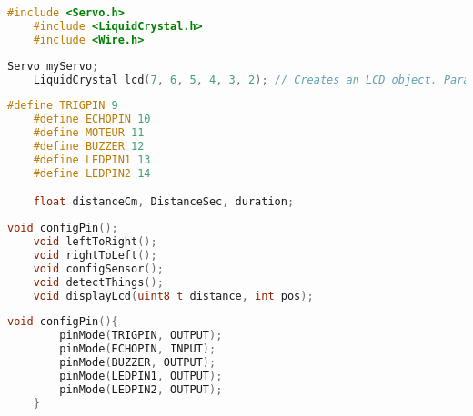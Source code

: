 
\begin{lstlisting}[language=cpp,caption={Insert Library}]
    #include <Servo.h>
    #include <LiquidCrystal.h>
    #include <Wire.h>
\end{lstlisting}

\begin{lstlisting}[language=cpp,caption={Create Variable and LCD object}]
    Servo myServo;
    LiquidCrystal lcd(7, 6, 5, 4, 3, 2); // Creates an LCD object. Parameters: (rs, enable, d4, d5, d6, d7)
\end{lstlisting}

\begin{lstlisting}[language=cpp,caption={Define the Variables with the Value of PIN}]
    #define TRIGPIN 9
    #define ECHOPIN 10
    #define MOTEUR 11
    #define BUZZER 12
    #define LEDPIN1 13
    #define LEDPIN2 14

    float distanceCm, DistanceSec, duration;
\end{lstlisting}

\begin{lstlisting}[language=cpp,caption={Call the Funtions}]
    void configPin();
    void leftToRight();
    void rightToLeft();
    void configSensor();
    void detectThings();
    void displayLcd(uint8_t distance, int pos);
\end{lstlisting}

\begin{lstlisting}[language=cpp,caption={Define "configPin()" Function}]
    void configPin(){
        pinMode(TRIGPIN, OUTPUT);
        pinMode(ECHOPIN, INPUT);
        pinMode(BUZZER, OUTPUT);
        pinMode(LEDPIN1, OUTPUT);
        pinMode(LEDPIN2, OUTPUT);
    }
\end{lstlisting}

